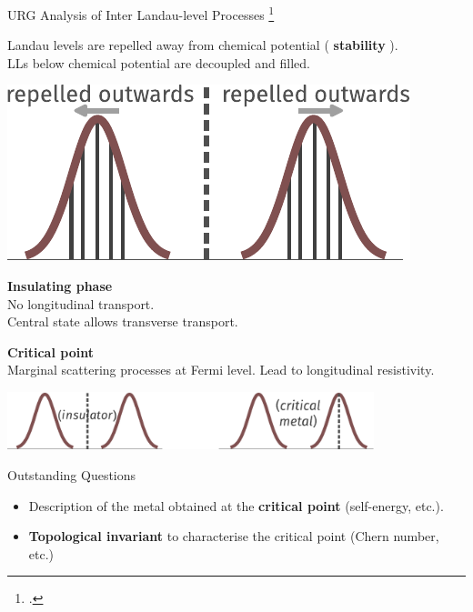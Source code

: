 \documentclass[11pt,aspectratio=169]{beamer}
\newcommand\focus[1]{%
	{\alert{\textbf{#1}}}
}
\begin{document}
\begin{frame}{URG Analysis of Inter Landau-level Processes}
	\footcite{cain2003,cain2005}
\begin{minipage}{0.45\textwidth}
Landau levels are repelled away from chemical potential (\focus{stability}).\\

LLs below chemical potential are decoupled and filled. 
\end{minipage}
\hspace*{\fill}
\begin{minipage}{0.4\textwidth}
	\includegraphics[width=\textwidth]{interLL.pdf}
\end{minipage}

\vspace{30pt}
\begin{minipage}{0.45\textwidth}
	\focus{Insulating phase}\\
	No longitudinal transport. \\
	Central state allows transverse transport.
\end{minipage}
\hspace*{\fill}
\begin{minipage}{0.45\textwidth}
	\focus{Critical point}\\
	Marginal scattering processes at Fermi level. Lead to longitudinal resistivity.
\end{minipage}
\includegraphics[width=0.8\textwidth]{effectiveTheoriesIQHE.pdf}
\end{frame}

\begin{frame}{Outstanding Questions}
	\begin{itemize}
		\item Description of the metal obtained at the \focus{critical point} (self-energy, etc.).\\[10pt]
		\item \focus{Topological invariant} to characterise the critical point (Chern number, etc.) \\[10pt]
	\end{itemize}
\end{frame}
\end{document}
